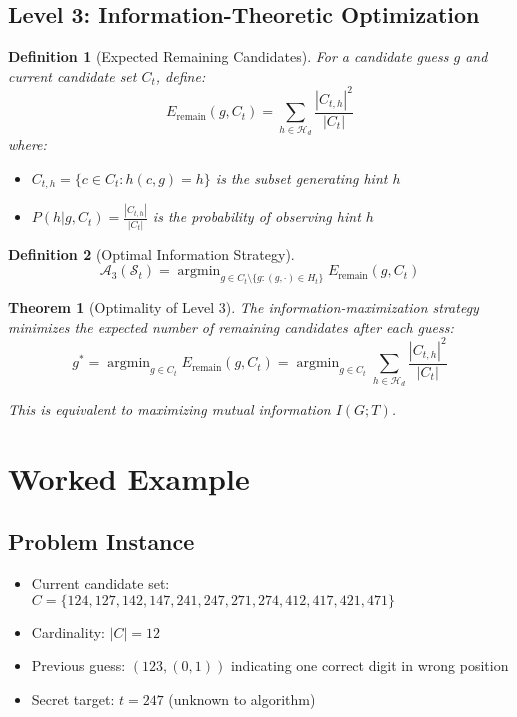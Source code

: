 \documentclass{article}
\DeclareMathOperator*{\argmin}{argmin}
\newtheorem{definition}{Definition}
\newtheorem{theorem}{Theorem}
\begin{document}
\subsection{Level 3: Information-Theoretic Optimization}

\begin{definition}[Expected Remaining Candidates]
For a candidate guess $g$ and current candidate set $C_t$, define:
$$E_{\text{remain}}(g, C_t) = \sum_{h \in \mathcal{H}_d} \frac{|C_{t,h}|^2}{|C_t|}$$
where:
\begin{itemize}
\item $C_{t,h} = \{c \in C_t : h(c, g) = h\}$ is the subset generating hint $h$
\item $P(h|g, C_t) = \frac{|C_{t,h}|}{|C_t|}$ is the probability of observing hint $h$
\end{itemize}
\end{definition}

\begin{definition}[Optimal Information Strategy]
$$\mathcal{A}_3(\mathcal{S}_t) = \argmin_{g \in C_t \setminus \{g : (g, \cdot) \in H_t\}} E_{\text{remain}}(g, C_t)$$
\end{definition}

\begin{theorem}[Optimality of Level 3]
The information-maximization strategy minimizes the expected number of remaining candidates after each guess:
$$g^* = \argmin_{g \in C_t} E_{\text{remain}}(g, C_t) = \argmin_{g \in C_t} \sum_{h \in \mathcal{H}_d} \frac{|C_{t,h}|^2}{|C_t|}$$

This is equivalent to maximizing mutual information $I(G; T)$.
\end{theorem}

\section{Worked Example}

\subsection{Problem Instance}
\begin{itemize}
\item Current candidate set: $C = \{124, 127, 142, 147, 241, 247, 271, 274, 412, 417, 421, 471\}$
\item Cardinality: $|C| = 12$
\item Previous guess: $(123, (0,1))$ indicating one correct digit in wrong position
\item Secret target: $t = 247$ (unknown to algorithm)
\end{itemize}
\end{document}
